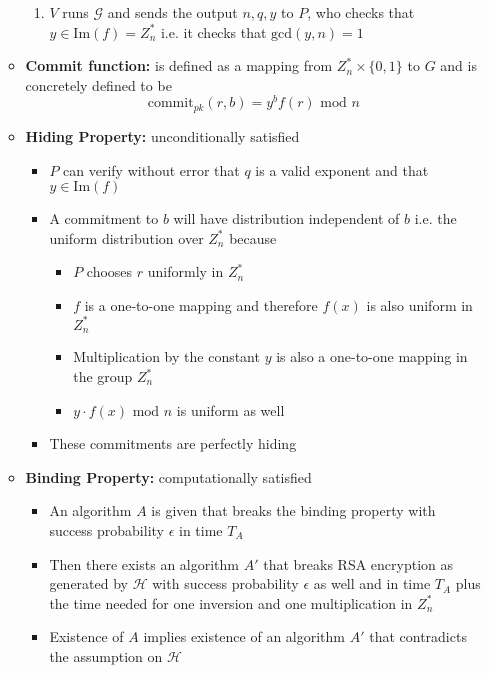 \begin{itemize}
\begin{itemize}
\begin{enumerate}
      \item $V$ runs $\mathcal G$ and sends the output $n,q,y$ to $P$, who checks that $y \in \text{Im}(f) = Z_n^*$ i.e. it checks that $\text{gcd}(y,n) = 1$
    \end{enumerate}
  	\item \textbf{Commit function:} is defined as a mapping from $Z^*_n \times \{0,1\}$ to $G$ and is concretely defined to be
    \[
      \text{commit}_{pk}(r,b) = y^bf(r)\text{ mod } n
    \]
  	\item \textbf{Hiding Property:} unconditionally satisfied
    \begin{itemize}
  		\item $P$ can verify without error that $q$ is a valid exponent and that $y \in \text{Im}(f)$
  		\item A commitment to $b$ will have distribution independent of $b$ i.e. the uniform distribution over $Z_n^*$ because
      \begin{itemize}
			  \item $P$ chooses $r$ uniformly in $Z_n^*$
  			\item $f$ is a one-to-one mapping and therefore $f(x)$ is also uniform in $Z_n^*$
  			\item Multiplication by the constant $y$ is also a one-to-one mapping in the group $Z_n^*$
  			\item $y \cdot f(x) \text{ mod } n$ is uniform as well
      \end{itemize}
  		\item These commitments are perfectly hiding
    \end{itemize}
  	\item \textbf{Binding Property:} computationally satisfied
    \begin{itemize}
  		\item An algorithm $A$ is given that breaks the binding property with success probability $\epsilon$ in time $T_A$
  		\item Then there exists an algorithm $A'$ that breaks RSA encryption as generated by $\mathcal H$ with success probability $\epsilon$ as well and in time $T_A$ plus the time needed for one inversion and one multiplication in $Z_n ^*$
  		\item Existence of $A$ implies existence of an algorithm $A'$ that contradicts the assumption on $\mathcal H$
    \end{itemize}
  \end{itemize}
\end{itemize}

